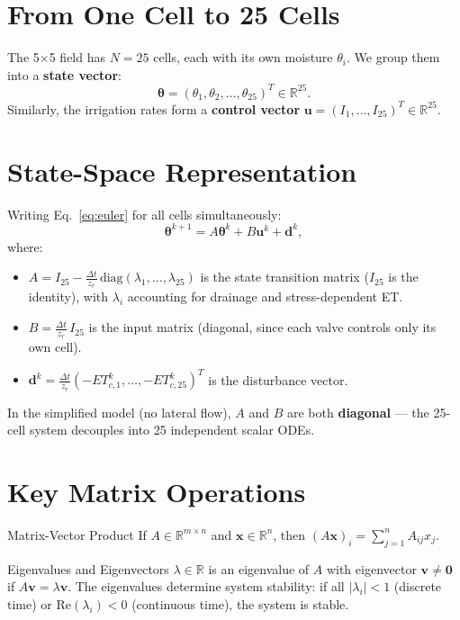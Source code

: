 \documentclass[12pt,a4paper,openany]{book}
\newcommand{\R}{\mathbb{R}}
\newcommand{\bx}{\bm{x}}
\newcommand{\bu}{\bm{u}}
\newcommand{\bth}{\bm{\theta}}
\begin{document}
\section{From One Cell to 25 Cells}

The 5$\times$5 field has $N=25$ cells, each with its own moisture $\theta_i$. We group them into a \textbf{state vector}:
\begin{equation}
  \bth = (\theta_1,\theta_2,\ldots,\theta_{25})^T \in \R^{25}.
\end{equation}
Similarly, the irrigation rates form a \textbf{control vector} $\bu=(I_1,\ldots,I_{25})^T\in\R^{25}$.

\section{State-Space Representation}

Writing Eq.~\eqref{eq:euler} for all cells simultaneously:
\begin{equation}
  \bth^{k+1} = A\bth^k + B\bu^k + \bm{d}^k,
  \label{eq:state_space}
\end{equation}
where:
\begin{itemize}[leftmargin=2em]
  \item $A = I_{25} - \frac{\Delta t}{z_r}\,\mathrm{diag}(\lambda_1,\ldots,\lambda_{25})$ is the state transition matrix ($I_{25}$ is the identity), with $\lambda_i$ accounting for drainage and stress-dependent ET.
  \item $B = \frac{\Delta t}{z_r}\,I_{25}$ is the input matrix (diagonal, since each valve controls only its own cell).
  \item $\bm{d}^k = \frac{\Delta t}{z_r}(-ET_{c,1}^k,\ldots,-ET_{c,25}^k)^T$ is the disturbance vector.
\end{itemize}
In the simplified model (no lateral flow), $A$ and $B$ are both \textbf{diagonal} — the 25-cell system decouples into 25 independent scalar ODEs.

\section{Key Matrix Operations}

\begin{defbox}{Matrix-Vector Product}
If $A\in\R^{m\times n}$ and $\bx\in\R^n$, then $(A\bx)_i=\sum_{j=1}^n A_{ij}x_j$.
\end{defbox}

\begin{defbox}{Eigenvalues and Eigenvectors}
$\lambda\in\R$ is an eigenvalue of $A$ with eigenvector $\bm{v}\neq\bm{0}$ if $A\bm{v}=\lambda\bm{v}$.
The eigenvalues determine system stability: if all $|\lambda_i|<1$ (discrete time) or $\mathrm{Re}(\lambda_i)<0$ (continuous time), the system is stable.
\end{defbox}
\end{document}
